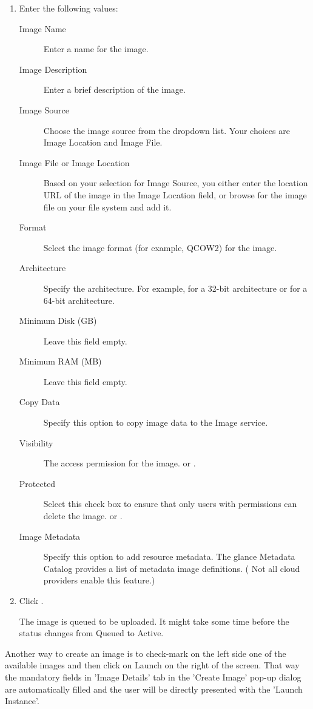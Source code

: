 \begin{enumerate}
\item Enter the following values:
  \begin{description}
  \item[Image Name] Enter a name for the image.
  \item[Image Description] Enter a brief description of the image.
  \item[Image Source] Choose the image source from the dropdown list. Your
    choices are Image Location and Image File.
  \item[Image File or Image Location] Based on your selection for
    Image Source, you either enter the location URL of the image in
    the Image Location field, or browse for the image file on your
    file system and add it.
  \item[Format] Select the image format (for example, QCOW2) for the
    image.
  \item[Architecture] Specify the architecture. For example,
     for a 32-bit architecture or  for a
    64-bit architecture.
  \item[Minimum Disk (GB)] Leave this field empty.
  \item[Minimum RAM (MB)] Leave this field empty.
  \item[Copy Data] Specify this option to copy image data to the Image
    service.
  \item[Visibility] The access permission for the
    image.  or .
  \item[Protected] Select this check box to ensure that only users
    with permissions can delete the image.  or
    .
  \item[Image Metadata] Specify this option to add resource
    metadata. The glance Metadata Catalog provides a list of metadata
    image definitions.  ( Not all cloud providers enable
    this feature.)
  \end{description}
\item Click .

  The image is queued to be uploaded. It might take some time before
  the status changes from Queued to Active.
\end{enumerate}

Another way to create an image is to check-mark on the left side one of the available images and then click on Launch on the right of the screen. That way the mandatory fields in 'Image Details' tab in the 'Create Image' pop-up dialog are automatically filled and the user will be directly presented with the 'Launch Instance'.

